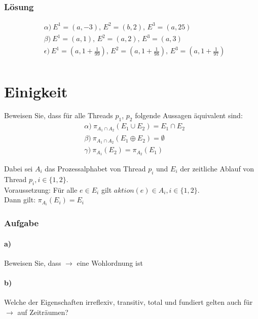 \documentclass[a4paper]{scrartcl}
\begin{document}
\subsubsection*{Lösung}
\begin{align*}
& \alpha) \ E^1 = (a, -3) \text{, } E^2 = (b, 2) \text{, } E^3 = (a, 25) \\
& \beta) \ E^1 = (a, 1) \text{, } E^2 = (a, 2) \text{, } E^3 = (a, 3) \\
& \epsilon) \ E^1 = \left(a, 1 + \frac{1}{99}\right) \text{, } E^2 = \left(a, 1 + \frac{1}{98}\right) \text{, } E^3 = \left(a, 1 + \frac{1}{97}\right) \\
\end{align*}

\section{Einigkeit}

Beweisen Sie, dass für alle Threads $ p_1 $, $ p_2 $ folgende Aussagen äquivalent sind:
\begin{align*}
& \alpha) \ \pi_{A_1 \cap A_2} \left(E_1 \cup E_2\right) = E_1 \cap E_2\\
& \beta) \ \pi_{A_1 \cap A_2} \left(E_1 \oplus E_2\right) = \emptyset\\
& \gamma) \ \pi_{A_1} \left(E_2\right) = \pi_{A_2} \left(E_1\right)
\end{align*}

Dabei sei $ A_i $ das Prozessalphabet von Thread $ p_i $ und $ E_i $ der zeitliche Ablauf von Thread $ p_i, i \in \{1, 2\}$.\\
Voraussetzung: Für alle $ e \in E_i $ gilt $ aktion(e) \in A_i, i \in \{1, 2\} $.\\
Dann gilt: $ \pi_{A_i} \left(E_i\right) = E_i $\\


\subsubsection*{Aufgabe}

\paragraph{a)} Beweisen Sie, dass $ \rightarrow $ eine Wohlordnung ist

\paragraph{b)} Welche der Eigenschaften irreflexiv, transitiv, total und fundiert gelten auch für $ \rightarrow $ auf Zeiträumen?
\end{document}
